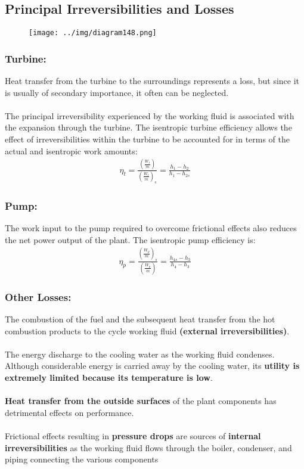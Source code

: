 \documentclass[class=report, crop=false, 12pt,a4paper]{standalone}
\numberwithin{equation}{section}
\begin{document}
\subsection{Principal Irreversibilities and Losses}
\begin{figure}[H]
  \centering
  \texttt{[image: ../img/diagram148.png]}
  \caption{}
\end{figure}
\subsubsection{Turbine:}
Heat transfer from the turbine to the surroundings represents a loss, but since it is usually of secondary importance, it often can be neglected. \\\\
The principal irreversibility experienced by the working fluid is associated with the expansion through the turbine. The isentropic turbine efficiency allows the effect of irreversibilities within the turbine to be accounted for in terms of the actual and isentropic work amounts:
\begin{gather}
  \eta_t = \frac{\left(\frac{\dot{W}_t}{\dot{m}}\right)}{\left(\frac{\dot{W}_t}{\dot{m}}\right)_s} = \frac{h_1-h_2}{h_1-h_{2s}}
\end{gather}
\subsubsection{Pump:}
The work input to the pump required to overcome frictional effects also reduces the net power output of the plant. The isentropic pump efficiency is: 
\begin{gather}
  \eta_p = \frac{\left(\frac{\dot{W}_p}{\dot{m}}\right)_s}{\left(\frac{\dot{W}_p}{\dot{m}}\right)} = \frac{h_{4s}-h_3}{h_4-h_3}
\end{gather}
\subsubsection{Other Losses:}
The combustion of the fuel and the subsequent heat transfer from the hot combustion products to the cycle working fluid \textbf{(external irreversibilities)}. \\\\
The energy discharge to the cooling water as the working fluid condenses. Although considerable energy is carried away by the cooling water, its \textbf{utility is extremely limited because its temperature is low}. \\\\
\textbf{Heat transfer from the outside surfaces} of the plant components has detrimental effects on performance. \\\\
Frictional effects resulting in \textbf{pressure drops} are sources of \textbf{internal irreversibilities} as the working fluid flows through the boiler, condenser, and piping connecting the various components
\end{document}
